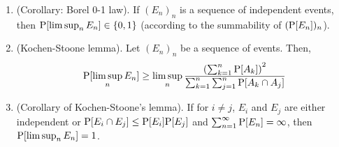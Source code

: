\documentclass[a4paper,10pt]{scrbook}
\begin{document}
\begin{enumerate}
 \item (Corollary: Borel 0-1 law). If $(E_n)_n$ is a sequence of independent events, 
       then $\mathrm{P}[\limsup_n E_n]\in\{0,1\}$ (according to the summability of $(\mathrm{P}[E_n])_n$).

 \item (Kochen-Stoone lemma). Let $(E_n)_n$ be a sequence of events. Then,
 \[
  \mathrm{P}[\limsup_n E_n] \geq \limsup_n \frac{\left(\sum_{k=1}^n \mathrm{P}[A_k]\right)^2}{\sum_{k=1}^{n}\sum_{j=1}^{n}\mathrm{P}[A_k\cap A_j]}
 \]
 
 \item (Corollary of Kochen-Stoone's lemma). If for $i\neq j$, $E_i$ and $E_j$ are either independent 
       or $\mathrm{P}[E_i\cap E_j] \leq \mathrm{P}[E_i]\mathrm{P}[E_j]$ and $\sum_{n=1}^{\infty}\mathrm{P}[E_n]=\infty$,
       then $\mathrm{P}[\limsup_n E_n] = 1$.

\end{enumerate}
\end{document}
